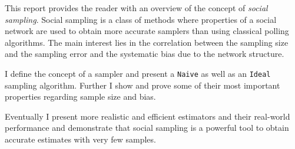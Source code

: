 This report provides the reader with an overview of the concept of \textit{social sampling}.
Social sampling is a class of methods where properties of a social network are used to obtain more accurate samplers than using classical polling algorithms. The main interest lies in the correlation between the sampling size and the sampling error and the systematic bias due to the network structure.

I define the concept of a sampler and present a \texttt{Naive} as well as an \texttt{Ideal} sampling algorithm. Further I show and prove some of their most important properties regarding sample size and bias.

Eventually I present more realistic and efficient estimators and their real-world performance and demonstrate that social sampling is a powerful tool to obtain accurate estimates with very few samples.
